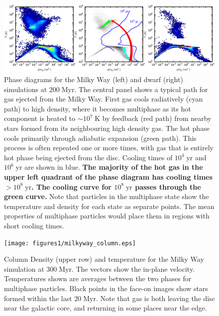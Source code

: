 \begin{figure}
    \includegraphics[width=\textwidth]{figures1/disc_phase.eps}
    \caption[Phase diagram of gas in isolated galaxies]{Phase diagrams for the
    Milky Way (left) and dwarf (right) simulations at $200\;\mathrm{Myr}$.  The
    central panel shows a typical path for gas ejected from the Milky Way.
    First gas cools radiatively (cyan path) to high density, where it becomes
    multiphase as its hot component is heated to $\sim10^7\;\mathrm{K}$ by
    feedback (red path) from nearby stars formed from its neighbouring high
    density gas.  The hot phase cools primarily through adiabatic expansion
    (green path).  This process is often repeated one or more times, with gas
    that is entirely hot phase being ejected from the disc.  Cooling times of
    $10^4\;\mathrm{yr}$ and $10^6\;\mathrm{yr}$ are shown in blue. {\bf The
    majority of the hot gas in the upper left quadrant of the phase diagram has
    cooling times $>10^8\;\mathrm{yr}$.  The cooling curve for
    $10^8\;\mathrm{yr}$ passes through the green curve.}  Note that particles in
    the multiphase state show the temperature and density for each state as
    separate points.  The mean properties of multiphase particles would place
    them in regions with short cooling times.}
    \label{disc_phase}
\end{figure}

\begin{figure}
    \texttt{[image: figures1/milkyway\_column.eps]}
    \caption[Column density and temperature images of isolated Milky Way]{Column
    Density (upper row) and temperature for the Milky Way simulation at
    $300\;\mathrm{Myr}$.  The vectors show the in-plane velocity.  Temperatures
    shown are averages between the two phases for multiphase particles.  Black
    points in the face-on images show stars formed within the last
    $20\;\mathrm{Myr}$. Note that gas is both leaving the disc near the galactic
    core, and returning in some places near the edge.}
    \label{milkyway_column}
\end{figure}

